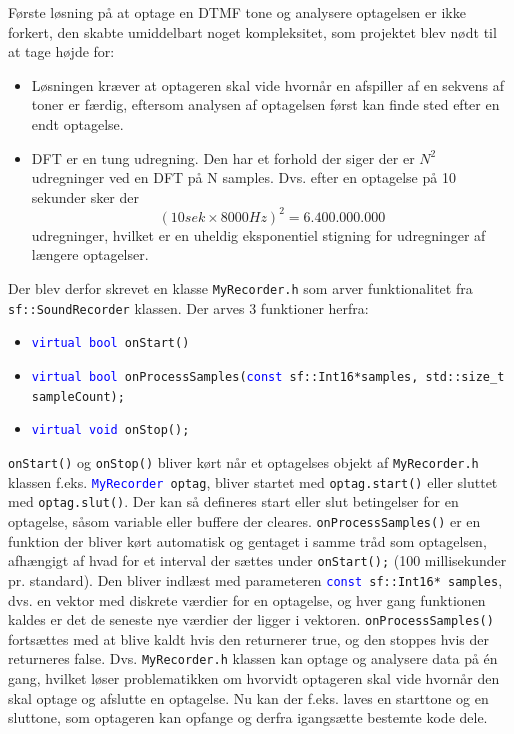 \newline
Første løsning på at optage en DTMF tone og analysere optagelsen er ikke forkert, den skabte umiddelbart noget kompleksitet, som projektet blev nødt til at tage højde for:
\begin{itemize}
	\item Løsningen kræver at optageren skal vide hvornår en afspiller af en sekvens af toner er færdig, eftersom analysen af optagelsen først kan finde sted efter en endt optagelse.
	
	\item DFT er en tung udregning. Den har et forhold der siger der er $N^2$ udregninger ved en DFT på N samples. Dvs. efter en optagelse på 10 sekunder sker der
	$$(10 sek \times 8000 Hz)^2 = 6.400.000.000$$
	udregninger, hvilket er en uheldig eksponentiel stigning for udregninger af længere optagelser.
\end{itemize}
Der blev derfor skrevet en klasse \texttt{MyRecorder.h} som arver funktionalitet fra \texttt{sf::\textcolor{dkgreen}{SoundRecorder}} klassen. Der arves 3 funktioner herfra:
\begin{itemize}
	\item \texttt{\textcolor{blue}{virtual bool} onStart()}
	
	\item \texttt{\textcolor{blue}{virtual bool} onProcessSamples(\textcolor{blue}{const} sf::\textcolor{dkgreen}{Int16*}samples, std::\textcolor{dkgreen}{size\_t} sampleCount);}
	
	\item \texttt{\textcolor{blue}{virtual void} onStop();}
\end{itemize}
\texttt{onStart()} og \texttt{onStop()} bliver kørt når et optagelses objekt af \texttt{MyRecorder.h} klassen f.eks. \texttt{\textcolor{blue}{MyRecorder} optag}, bliver startet med \texttt{optag.start()} eller sluttet med \texttt{optag.slut()}. Der kan så defineres start eller slut betingelser for en optagelse, såsom variable eller buffere der cleares.
\newline
\texttt{onProcessSamples()} er en funktion der bliver kørt automatisk og gentaget i samme tråd som optagelsen, afhængigt af hvad for et interval der sættes under \texttt{onStart();} (100 millisekunder pr. standard). Den bliver indlæst med parameteren \texttt{\textcolor{blue}{const} sf::\textcolor{dkgreen}{Int16*} samples}, dvs. en vektor med diskrete værdier for en optagelse, og hver gang funktionen kaldes er det de seneste nye værdier der ligger i vektoren. \texttt{onProcessSamples()} fortsættes med at blive kaldt hvis den returnerer true, og den stoppes hvis der returneres false.
\newline
Dvs. \texttt{MyRecorder.h} klassen kan optage og analysere data på én gang, hvilket løser problematikken om hvorvidt optageren skal vide hvornår den skal optage og afslutte en optagelse. Nu kan der f.eks. laves en starttone og en sluttone, som optageren kan opfange og derfra igangsætte bestemte kode dele.
\newline

